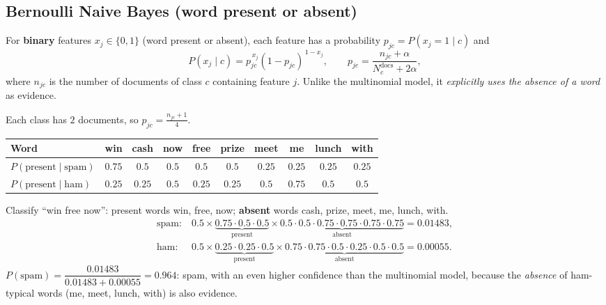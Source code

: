 \subsection{Bernoulli Naive Bayes (word present or absent)}

\begin{definition}
For \textbf{binary} features $x_j\in\{0,1\}$ (word present or absent), each feature has a probability $p_{jc}=P(x_j=1\mid c)$ and
\[
  P(x_j\mid c)=p_{jc}^{\,x_j}(1-p_{jc})^{\,1-x_j},\qquad p_{jc}=\frac{n_{jc}+\alpha}{N_c^{\text{docs}}+2\alpha},
\]
where $n_{jc}$ is the number of documents of class $c$ containing feature $j$. Unlike the multinomial model, it \emph{explicitly uses the absence of a word} as evidence.
\end{definition}

\begin{example}
Each class has $2$ documents, so $p_{jc}=\frac{n_{jc}+1}{4}$.

\begin{center}
\small
\begin{tabular}{@{}l|ccccccccc@{}}
\toprule
\textbf{Word} & win & cash & now & free & prize & meet & me & lunch & with\\
\midrule
$P(\text{present}\mid\text{spam})$ & $0.75$ & $0.5$ & $0.5$ & $0.5$ & $0.5$ & $0.25$ & $0.25$ & $0.25$ & $0.25$\\
$P(\text{present}\mid\text{ham})$ & $0.25$ & $0.25$ & $0.5$ & $0.25$ & $0.25$ & $0.5$ & $0.75$ & $0.5$ & $0.5$\\
\bottomrule
\end{tabular}
\end{center}

\medskip
Classify ``win free now'': present words win, free, now; \textbf{absent} words cash, prize, meet, me, lunch, with.
\begin{align*}
\text{spam:}\ & 0.5\times\underbrace{0.75\cdot0.5\cdot0.5}_{\text{present}}\times\underbrace{0.5\cdot0.5\cdot0.75\cdot0.75\cdot0.75\cdot0.75}_{\text{absent}}=0.01483,\\
\text{ham:}\ & 0.5\times\underbrace{0.25\cdot0.25\cdot0.5}_{\text{present}}\times\underbrace{0.75\cdot0.75\cdot0.5\cdot0.25\cdot0.5\cdot0.5}_{\text{absent}}=0.00055 .
\end{align*}
$P(\text{spam})=\dfrac{0.01483}{0.01483+0.00055}=\mathbf{0.964}$: spam, with an even higher confidence than the multinomial model, because the \emph{absence} of ham-typical words (me, meet, lunch, with) is also evidence.
\end{example}

